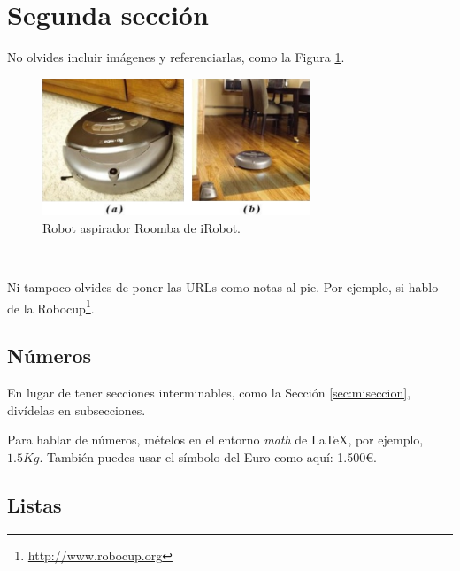 

\section{Segunda sección}
\label{sec:segundaseccion}

No olvides incluir imágenes y referenciarlas, como la Figura \ref{fig:roomba}.

\begin{figure} [h!]
  \begin{center}
    \includegraphics[width=8cm]{figs/roomba}
  \end{center}
  \caption{Robot aspirador Roomba de iRobot.}
  \label{fig:roomba}
\end{figure}\

Ni tampoco olvides de poner las URLs como notas al pie. Por ejemplo, si hablo de la Robocup\footnote{\url{http://www.robocup.org}}.

\subsection{Números}
\label{sec:subseccion}

En lugar de tener secciones interminables, como la Sección \ref{sec:miseccion}, divídelas en subsecciones.

Para hablar de números, mételos en el entorno \textit{math} de \LaTeX, por ejemplo, $1.5Kg$. También puedes usar el símbolo del Euro como aquí: 1.500\euro.

\subsection{Listas}

